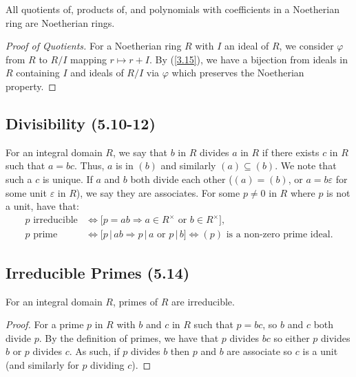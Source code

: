 All quotients of, products of, and polynomials with coefficients
in a Noetherian ring are Noetherian rings.

\begin{proof}[Proof of Quotients]
    For a Noetherian ring $R$ with $I$ an ideal of $R$, we consider
    $\varphi$ from $R$ to $R / I$ mapping $r \mapsto r + I$.
    By (\ref{3.15}), we have a bijection from ideals
    in $R$ containing $I$ and ideals of $R / I$ via $\varphi$
    which preserves the Noetherian property.
\end{proof}

\subsection{Divisibility (5.10-12)} \label{5.10} \label{5.11} \label{5.12}

For an integral domain $R$, we say that $b$ in $R$ divides $a$ in $R$
if there exists $c$ in $R$ such that $a = bc$. Thus, $a$ is in $(b)$
and similarly $(a) \subseteq (b)$. We note that such a $c$ is unique.
\bs
If $a$ and $b$ both divide each other ($(a) = (b)$, or $a = b\varepsilon$
for some unit $\varepsilon$ in $R$), we say they are associates.
For some $p \neq 0$ in $R$ where $p$ is not a unit, have that: \begin{align*}
    p \text{ irreducible} &\Longleftrightarrow 
    \bigl[p = ab \Longrightarrow a \in R^\times \text{ or } b \in R^\times
    \bigr], \\
    p \text{ prime} &\Longleftrightarrow 
    \bigl[p \, | \, ab \Longrightarrow p \, | \, a \text{ or } p \, | \, b
    \bigr]
    \Longleftrightarrow (p) \text{ is a non-zero prime ideal}.
\end{align*}

\subsection{Irreducible Primes (5.14)} \label{5.14}

For an integral domain $R$, primes of $R$ are irreducible.

\begin{proof}
    For a prime $p$ in $R$ with $b$ and $c$ in $R$ such that $p = bc$,
    so $b$ and $c$ both divide $p$. By the definition of primes, we have 
    that $p$ divides $bc$ so either $p$ divides $b$ or $p$ divides
    $c$. As such, if $p$ divides $b$ then $p$ and $b$ are associate
    so $c$ is a unit (and similarly for $p$ dividing $c$).
\end{proof}

